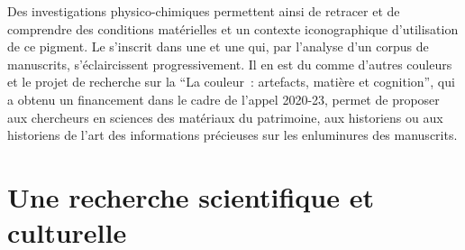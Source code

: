 Des investigations physico-chimiques permettent ainsi de retracer et de comprendre des conditions matérielles et un contexte iconographique d’utilisation de ce pigment. Le  s’inscrit dans une  et une  qui, par l’analyse d’un corpus de manuscrits, s’éclaircissent progressivement. Il en est du  comme d’autres couleurs et le projet de recherche sur la \enquote{La couleur~: artefacts, matière et cognition}, qui a obtenu un financement dans le cadre de l’appel 2020-23, permet de proposer aux chercheurs en sciences des matériaux du patrimoine, aux historiens ou aux historiens de l’art des informations précieuses sur les enluminures des manuscrits.

\section{Une recherche scientifique et culturelle}

